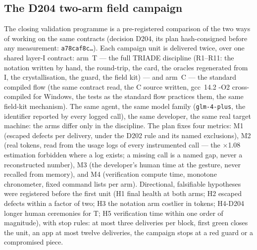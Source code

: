 \documentclass[10pt,a4paper]{article}
\newcommand{\code}[1]{\texttt{\small #1}}
\begin{document}


\subsection{The D204 two-arm field campaign}\label{sec:campagne}

The closing validation programme is a pre-registered comparison of the
two ways of working on the same contracts (decision D204, its plan
hash-consigned before any measurement: \code{a78caf8c\ldots}). Each
campaign unit is delivered twice, over one shared layer-I contract:
arm~T --- the full TRIADE discipline (R1--R11: the notation written by
hand, the round-trip, the card, the oracles regenerated from I, the
crystallisation, the guard, the field kit) --- and arm~C --- the
standard compiled flow (the same contract read, the C source written,
gcc~14.2 -O2 cross-compiled for Windows, the tests as the standard flow
practices them, the same field-kit mechanism). The same agent, the
same model family (\code{glm-4-plus}, the identifier reported by every
logged call), the same developer, the same real target machine: the
arms differ only in the discipline. The plan fixes four metrics:
M1 (escaped defects per delivery, under the D202 rule and its named
exclusions), M2 (real tokens, read from the usage logs of every
instrumented call --- the $\times$1.08 estimation forbidden where a log
exists; a missing call is a named gap, never a reconstructed number),
M3 (the developer's human time at the gesture, never recalled from
memory), and M4 (verification compute time, monotone chronometer,
fixed command lists per arm). Directional, falsifiable hypotheses were
registered before the first unit (H1 final health at both arms; H2
escaped defects within a factor of two; H3 the notation arm costlier in
tokens; H4-D204 longer human ceremonies for T; H5 verification time
within one order of magnitude), with stop rules: at most three
deliveries per block, first green closes the unit, an app at most
twelve deliveries, the campaign stops at a red guard or a compromised
piece.
\end{document}
